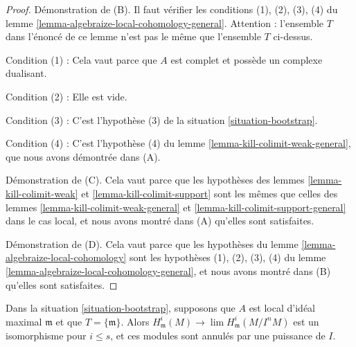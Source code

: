 \begin{proof}
\medskip\noindent
Démonstration de (B). Il faut vérifier les conditions (1), (2), (3), (4) du
lemme \ref{lemma-algebraize-local-cohomology-general}. Attention :
l'ensemble $T$ dans l'énoncé de
ce lemme n'est pas le même que l'ensemble $T$ ci-dessus.

\medskip\noindent
Condition (1) : Cela vaut parce que $A$ est complet et possède un complexe dualisant.

\medskip\noindent
Condition (2) : Elle est vide.

\medskip\noindent
Condition (3) : C'est l'hypothèse (3) de la
situation \ref{situation-bootstrap}.

\medskip\noindent
Condition (4) : C'est l'hypothèse (4) du
lemme \ref{lemma-kill-colimit-weak-general}, que nous avons démontrée dans (A).

\medskip\noindent
Démonstration de (C). Cela vaut parce que les hypothèses des
lemmes \ref{lemma-kill-colimit-weak} et \ref{lemma-kill-colimit-support}
sont les mêmes que celles des
lemmes \ref{lemma-kill-colimit-weak-general} et
\ref{lemma-kill-colimit-support-general} dans le cas local,
et nous avons montré dans (A) qu'elles sont satisfaites.

\medskip\noindent
Démonstration de (D). Cela vaut parce que les hypothèses du
lemme \ref{lemma-algebraize-local-cohomology}
sont les hypothèses (1), (2), (3), (4) du
lemme \ref{lemma-algebraize-local-cohomology-general},
et nous avons montré dans (B) qu'elles sont satisfaites.
\end{proof}

\begin{lemma}
\label{lemma-algebraize-local-cohomology-bis}
Dans la situation \ref{situation-bootstrap}, supposons que $A$ est local d'idéal
maximal $\mathfrak m$ et que $T = \{\mathfrak m\}$. Alors
$H^i_\mathfrak m(M) \to \lim H^i_\mathfrak m(M/I^nM)$
est un isomorphisme pour $i \leq s$, et ces modules sont
annulés par une puissance de $I$.
\end{lemma}

